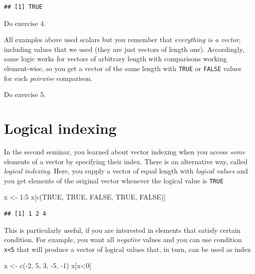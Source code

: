 \documentclass[
]{book}
\newenvironment{Shaded}{\begin{snugshade}}{\end{snugshade}}
\newcommand{\ConstantTok}[1]{\textcolor[rgb]{0.00,0.00,0.00}{#1}}
\newcommand{\DecValTok}[1]{\textcolor[rgb]{0.00,0.00,0.81}{#1}}
\newcommand{\FunctionTok}[1]{\textcolor[rgb]{0.00,0.00,0.00}{#1}}
\newcommand{\NormalTok}[1]{#1}
\newcommand{\OtherTok}[1]{\textcolor[rgb]{0.56,0.35,0.01}{#1}}
\newcommand{\SpecialCharTok}[1]{\textcolor[rgb]{0.00,0.00,0.00}{#1}}
\begin{document}
\begin{verbatim}
## [1] TRUE
\end{verbatim}

Do exercise 4.

All examples above used scalars but you remember that \emph{everything is a vector}, including values that we used (they are just vectors of length one). Accordingly, same logic works for vectors of arbitrary length with comparisons working element-wise, so you get a vector of the same length with \texttt{TRUE} or \texttt{FALSE} values for each \emph{pairwise} comparison.

Do exercise 5.

\hypertarget{logical-indexing}{%
\section{Logical indexing}\label{logical-indexing}}

In the second seminar, you learned about vector indexing when you access \emph{some} elements of a vector by specifying their index. There is an alternative way, called \emph{logical indexing}. Here, you supply a vector of equal length with \emph{logical values} and you get elements of the original vector whenever the logical value is \texttt{TRUE}

\begin{Shaded}
\begin{Highlighting}[]
\NormalTok{x }\OtherTok{\textless{}{-}} \DecValTok{1}\SpecialCharTok{:}\DecValTok{5}
\NormalTok{x[}\FunctionTok{c}\NormalTok{(}\ConstantTok{TRUE}\NormalTok{, }\ConstantTok{TRUE}\NormalTok{, }\ConstantTok{FALSE}\NormalTok{, }\ConstantTok{TRUE}\NormalTok{, }\ConstantTok{FALSE}\NormalTok{)]}
\end{Highlighting}
\end{Shaded}

\begin{verbatim}
## [1] 1 2 4
\end{verbatim}

This is particularly useful, if you are interested in elements that satisfy certain condition. For example, you want all \emph{negative} values and you can use condition \texttt{x\textless{}5} that will produce a vector of logical values that, in turn, can be used as index

\begin{Shaded}
\begin{Highlighting}[]
\NormalTok{x }\OtherTok{\textless{}{-}} \FunctionTok{c}\NormalTok{(}\SpecialCharTok{{-}}\DecValTok{2}\NormalTok{, }\DecValTok{5}\NormalTok{, }\DecValTok{3}\NormalTok{, }\SpecialCharTok{{-}}\DecValTok{5}\NormalTok{, }\SpecialCharTok{{-}}\DecValTok{1}\NormalTok{)}
\NormalTok{x[x}\SpecialCharTok{\textless{}}\DecValTok{0}\NormalTok{]}
\end{Highlighting}
\end{Shaded}
\end{document}
